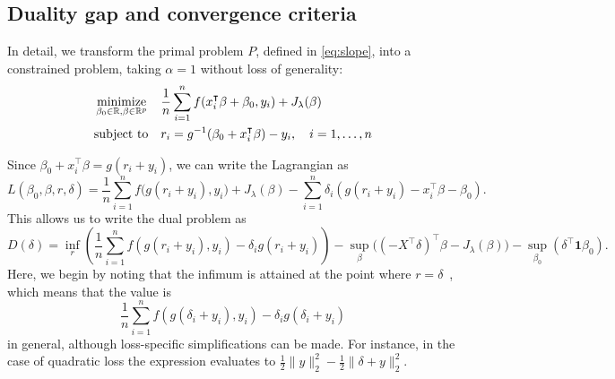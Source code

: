 \documentclass[article]{jss}
\begin{document}
\begin{appendix}

  \section{Duality gap and convergence criteria}
  \label{sec:convergence-criteria-details}

  In detail, we transform the primal problem \(P\), defined in \autoref{eq:slope}, into a
  constrained problem, taking \(\alpha = 1\) without loss of generality:
  \begin{equation}
    \begin{aligned}
       & \operatorname*{minimize}_{\beta_0 \in \mathbb{R},\beta \in \mathbb{R}^p} &  & \frac{1}{n} \sum_{i=1}^n f(x_i^\intercal \beta + \beta_0, y_i) + J_{\lambda}(\beta) \\
       & \text{subject to}                                         &  & r_i = g^{-1}(\beta_0 + x_i^\intercal \beta) - y_i, \quad i = 1, \ldots, n           \\
    \end{aligned}
  \end{equation}

  Since \(\beta_0 + x_i^\intercal \beta = g(r_i + y_i)\), we can write the Lagrangian as
  \[
    L(\beta_0,\beta,r,\delta) = \frac{1}{n} \sum_{i=1}^n f\big(g(r_i + y_i), y_i\big) + J_{\lambda}(\beta) - \sum_{i=1}^n \delta_i \left(g(r_i + y_i) - x_i^\intercal \beta - \beta_0 \right).
  \]
  This allows us to write the dual problem as
  \[
    D(\delta)  = \inf_r\left( \frac{1}{n} \sum_{i=1}^n f\left(g(r_i+y_i), y_i\right) - \delta_i g(r_i+ y_i)\right)
    - \sup_\beta \big((-X^\intercal \delta)^\intercal \beta -  J_\lambda(\beta) \big)
    - \sup_{\beta_0} \left( \delta^\intercal \bm{1} \beta_0\right).
  \]
  Here, we begin by noting that the infimum is attained at the point where
  \(r = \delta\)~\citep{fercoq2015}, which means that the value is
  \[
    \frac{1}{n} \sum_{i=1}^n f\left(g(\delta_i+y_i), y_i\right) - \delta_i g(\delta_i + y_i)
  \]
  in general, although loss-specific simplifications can be made. For instance, in the case of
  quadratic loss the expression evaluates to \(\frac{1}{2} \lVert y \rVert_2^2 - \frac{1}{2} \lVert \delta + y \lVert^2_2 \).


\end{appendix}
\end{document}
